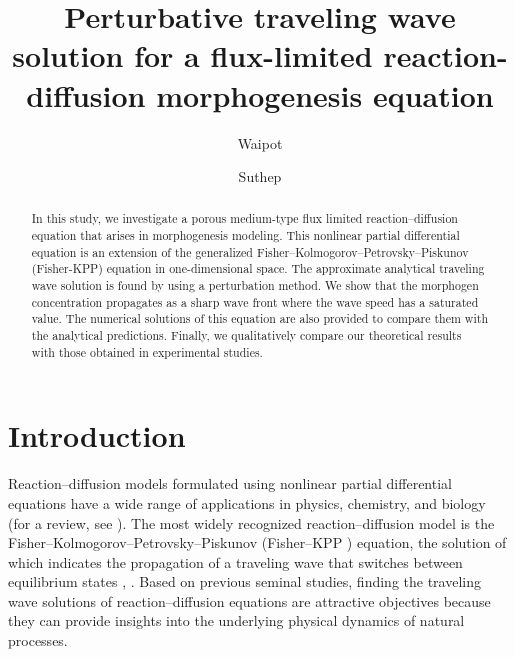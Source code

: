 \documentclass[jkps,preprint,fleqn,showpacs,showkeys]{revtex4}
\begin{document}
\setcounter{page}{0}
\title{Perturbative traveling wave solution for a flux-limited reaction-diffusion morphogenesis equation}

\author{Waipot }

\author{Suthep }

\date[]{}

\begin{abstract}
In this study, we investigate a porous medium-type flux limited reaction--diffusion equation that arises in morphogenesis modeling. This nonlinear partial differential equation is an extension of the generalized Fisher--Kolmogorov--Petrovsky--Piskunov (Fisher-KPP) equation in one-dimensional space. The approximate analytical traveling wave solution is found by using a perturbation method. We show that the morphogen concentration propagates as a sharp wave front where the wave speed has a saturated value. The numerical solutions of this equation are also provided to compare them with the analytical predictions. Finally, we qualitatively compare our theoretical results with those obtained in experimental studies.
\end{abstract}


\maketitle

\section{Introduction \label{sec:Intro}}
Reaction--diffusion models formulated using nonlinear partial differential equations have a wide range of applications in physics, chemistry, and biology (for a review, see \cite{Murray1989}). The most widely recognized reaction--diffusion model is the Fisher--Kolmogorov--Petrovsky--Piskunov (Fisher--KPP ) equation, the solution of which indicates the propagation of a traveling wave that switches between equilibrium states \cite{Fisher1937}, \cite{Tikhomirov1991}. Based on previous seminal studies, finding the traveling wave solutions of reaction--diffusion equations are attractive objectives because they can provide insights into the underlying physical dynamics of natural processes.
\end{document}
